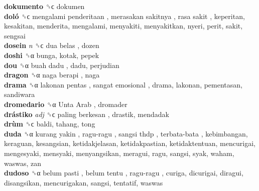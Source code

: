 \textbf{dokumento} ␝ϲ  dokumen  \\
\textbf{doló} ␝ϲ   mengalami penderitaan ,  merasakan sakitnya ,  rasa sakit , keperitan, kesakitan, menderita, mengalami, menyakiti, menyakitkan, nyeri, perit, sakit, sengsai  \\
\textbf{dosein} \emph{n}  ␝ϲ   dua belas , dozen  \\
\textbf{doshi} ␝α  bunga, kotak, pepek  \\
\textbf{dou} ␝α   buah dadu , dadu, perjudian  \\
\textbf{dragon} ␝α   naga berapi , naga  \\
\textbf{drama} ␝α   lakonan pentas ,  sangat emosional , drama, lakonan, pementasan, sandiwara  \\
\textbf{dromedario} ␝α   Unta Arab , dromader  \\
\textbf{drástiko} \emph{adj}  ␝ϲ   paling berkesan , drastik, mendadak  \\
\textbf{drùm} ␝ϲ  baldi, tahang, tong  \\
\textbf{duda} ␝α   kurang yakin ,  ragu-ragu ,  sangsi thdp ,  terbata-bata , kebimbangan, keraguan, kesangsian, ketidakjelasan, ketidakpastian, ketidaktentuan, mencurigai, mengesyaki, mensyaki, menyangsikan, meragui, ragu, sangsi, syak, waham, waswas, zan  \\
\textbf{dudoso} ␝α   belum pasti ,  belum tentu ,  ragu-ragu , curiga, dicurigai, diragui, disangsikan, mencurigakan, sangsi, tentatif, waswas  \\
